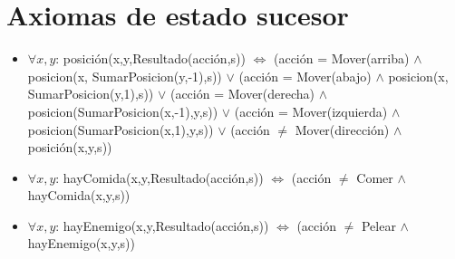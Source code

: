 \section{Axiomas de estado sucesor}

\begin{itemize}

\item $\forall x,y$: posición(x,y,Resultado(acción,s)) $\Leftrightarrow$
\newline (acción = Mover(arriba) $\land$ posicion(x, SumarPosicion(y,-1),s))
\newline $\lor$
\newline (acción = Mover(abajo) $\land$ posicion(x, SumarPosicion(y,1),s))
\newline $\lor$
\newline (acción = Mover(derecha) $\land$ posicion(SumarPosicion(x,-1),y,s))
\newline $\lor$
\newline (acción = Mover(izquierda) $\land$ posicion(SumarPosicion(x,1),y,s))
\newline $\lor$
\newline (acción $\ne$ Mover(dirección) $\land$ posición(x,y,s))

\item $\forall x,y$: hayComida(x,y,Resultado(acción,s)) $\Leftrightarrow$
\newline (acción $\ne$ Comer $\land$ hayComida(x,y,s))

\item $\forall x,y$: hayEnemigo(x,y,Resultado(acción,s)) $\Leftrightarrow$
\newline (acción $\ne$ Pelear $\land$ hayEnemigo(x,y,s))

\end{itemize}

